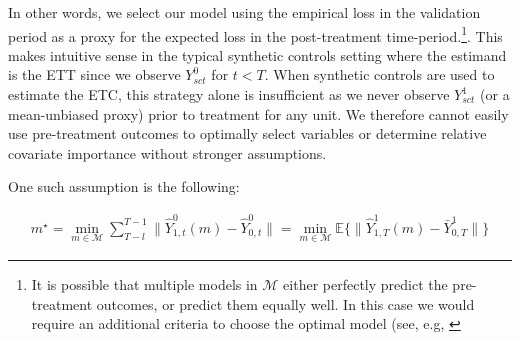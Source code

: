 \documentclass[article]{imsart}
\theoremstyle{plain}
\theoremstyle{remark}
\begin{document}
In other words, we select our model using the empirical loss in the validation period as a proxy for the expected loss in the post-treatment time-period.\footnote{It is possible that multiple models in $\mathcal{M}$ either perfectly predict the pre-treatment outcomes, or predict them equally well. In this case we would require an additional criteria to choose the optimal model (see, e.g, \cite{becker2017cross}}. This makes intuitive sense in the typical synthetic controls setting where the estimand is the ETT since we observe $Y^0_{sct}$ for $t < T$. When synthetic controls are used to estimate the ETC, this strategy alone is insufficient as we never observe $Y^1_{sct}$ (or a mean-unbiased proxy) prior to treatment for any unit. We therefore cannot easily use pre-treatment outcomes to optimally select variables or determine relative covariate importance without stronger assumptions.

One such assumption is the following:

\begin{align*}\label{assumption:second}
m^\star = \min_{m \in \mathcal{M}}\sum_{T - l}^{T-1}\|\hat{Y}^0_{1, t}(m) - \hat{Y}^0_{0, t}\| = \min_{m \in \mathcal{M}}\mathbb{E}\{\|\hat{Y}^1_{1, T}(m) - \bar{Y}^1_{0, T}\|\}
\end{align*}
\end{document}
